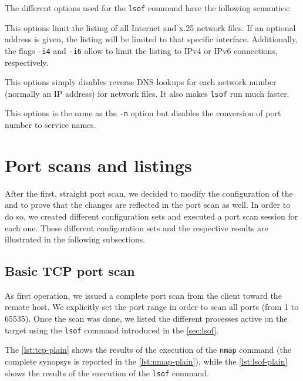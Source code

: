 \documentclass[10pt,a4paper,twoside,onecolumn]{article}
\begin{document}
The different options used for the \texttt{lsof} command have the following semantics:

\begin{description}[style=multiline,leftmargin=*]
	\item[\texttt{-i}] This options limit the listing of all Internet and x.25 network files. If an optional address is given, the listing will be limited to that specific interface. Additionally, the flags \texttt{-i4} and \texttt{-i6} allow to limit the listing to IPv4 or IPv6 connections, respectively.
	\item[\texttt{-n}] This options simply disables reverse DNS lookups for each network number (normally an IP address) for network files. It also makes \texttt{lsof} run much faster.
	\item[\texttt{-P}] This options is the same as the \texttt{-n} option but disables the conversion of port number to service names.
\end{description}

\section{Port scans and listings}
\label{sec:scans}

After the first, straight port scan, we decided to modify the configuration of the and to prove that the changes are reflected in the port scan as well. In order to do so, we created different configuration sets and executed a port scan session for each one. These different configuration sets and the respective results are illustrated in the following subsections.

\subsection{Basic TCP port scan}
\label{sec:basic}

As first operation, we issued a complete port scan from the client toward the remote host. We explicitly set the port range in order to scan all ports (from 1 to 65535). Once the scan was done, we listed the different processes active on the target using the \texttt{lsof} command introduced in the \autoref{sec:lsof}.

The \autoref{lst:tcp-plain} shows the results of the execution of the \texttt{nmap} command (the complete synopsys is reported in the \autoref{lst:nmap-plain}), while the \autoref{lst:lsof-plain} shows the results of the execution of the \texttt{lsof} command.
\end{document}
